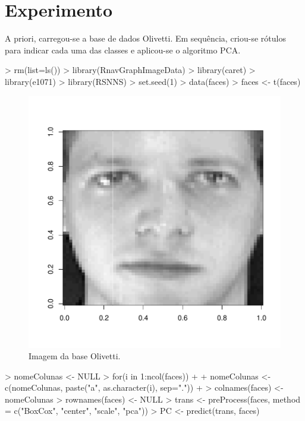 \documentclass[12pt]{article}
\begin{document}
\section{Experimento}

  \par A priori, carregou-se a base de dados Olivetti. Em sequência, criou-se rótulos para indicar cada uma das classes e aplicou-se o algoritmo PCA.

\begin{Schunk}
\begin{Sinput}
> rm(list=ls())
> library(RnavGraphImageData)
> library(caret)
> library(e1071)
> library(RSNNS)
> set.seed(1)
> data(faces)
> faces <- t(faces)
\end{Sinput}
\end{Schunk}

\begin{figure}[ht]
\centering
\includegraphics{PCA-002}

\caption{Imagem da base Olivetti.}
\label{1}
\end{figure}

\begin{Schunk}
\begin{Sinput}
> nomeColunas <- NULL
> for(i in 1:ncol(faces))
+ {
+   nomeColunas <- c(nomeColunas, paste("a", as.character(i), sep="."))
+ }
> colnames(faces) <- nomeColunas
> rownames(faces) <- NULL
> trans <- preProcess(faces, method = c("BoxCox", "center", "scale", "pca"))
> PC <- predict(trans, faces)
\end{Sinput}
\end{Schunk}
\end{document}
